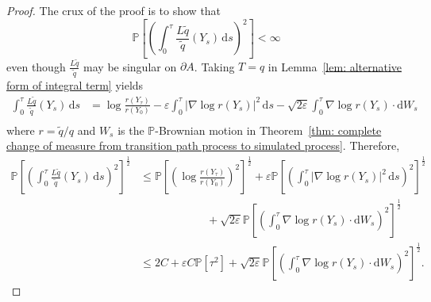 \documentclass[reqno]{amsart}
\newcommand{\eps}{\varepsilon}
\newcommand{\1}{\mathds{1}}
\renewcommand{\d}{\mathrm{d}}
\newcommand{\grad}{\nabla}
\renewcommand{\P}{\mathds{P}}
\theoremstyle{definition}
\theoremstyle{remark}
\begin{document}
\begin{proof}
  The crux of the proof is to show that
  \begin{equation*}
    \P \left [ \left (\int_0^\tau \frac{L \tilde q}{\tilde q}(Y_s) \, \d s \right )^2 \right ] < \infty
  \end{equation*}
  even though $\frac{L \tilde q}{\tilde q}$ may be singular on $\partial A$. Taking $T=q$ in Lemma~\ref{lem: alternative form of integral term} yields
  \begin{align*}
    \int_0^\tau \frac{L \tilde q}{\tilde q}(Y_s) \, \d s &= \log \frac{r(Y_\tau)}{r(Y_0)} - \eps \int_0^\tau \lvert \grad \log r(Y_s) \rvert^2 \, \d s - \sqrt{2 \eps} \int_0^\tau \grad \log r(Y_s) \cdot \d W_s \\
  \end{align*}
  where $r = \tilde q/q$ and $W_s$ is the $\P$-Brownian motion in Theorem~\ref{thm: complete change of measure from transition path process to simulated process}. Therefore, 
  \begin{align}
    \P \left [ \left (\int_0^\tau \frac{L \tilde q}{\tilde q}(Y_s) \, \d s \right )^2 \right ]^{\frac12} &\leq \P \left [ \left ( \log \frac{r(Y_\tau)}{r(Y_0)} \right )^2 \right ]^{\frac12} + \eps \P \left [ \left (\int_0^\tau \lvert \grad \log r(Y_s) \rvert^2 \, \d s \right )^2 \right ]^{\frac12}  \nonumber \\
                                                                                                         &\qquad \qquad \qquad +\sqrt{2 \eps} \P \left [ \left (\int_0^\tau \grad \log r(Y_s) \cdot \d W_s \right )^2 \right ]^{\frac12} \nonumber \\
                                                                                                           &\leq 2C + \eps C \P[\tau^2] + \sqrt{2 \eps} \P \left [ \left (\int_0^\tau \grad \log r(Y_s) \cdot \d W_s \right )^2 \right ]^{\frac12}.  \label{eq: triangle inequality in finite variance proof}                                                                                                                         
  \end{align}  
  

\end{proof}
\end{document}
